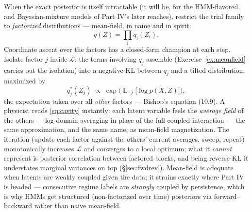 \documentclass[11pt]{article}
\numberwithin{equation}{section}
\theoremstyle{plain}
\theoremstyle{definition}
\theoremstyle{remark}
\DeclareMathOperator{\E}{\mathbb{E}}
\newcommand{\ELBO}{\mathcal{L}}
\begin{document}
When the exact posterior is itself intractable (it will be, for the HMM-flavored and Bayesian-mixture models of Part IV's later reaches), restrict the trial family to \emph{factorized} distributions --- mean-field, in name and in spirit:
\begin{equation}
q(Z) = \prod_{i} q_i(Z_i).
\label{eq:meanfield}
\end{equation}
Coordinate ascent over the factors has a closed-form champion at each step. Isolate factor $j$ inside $\ELBO$: the terms involving $q_j$ assemble (Exercise~\ref{ex:meanfield} carries out the isolation) into a negative KL between $q_j$ and a tilted distribution, maximized by
\begin{equation}
q_j^\ast(Z_j) \;\propto\; \exp\!\Big( \E_{-j}\big[ \log p(X, Z) \big] \Big),
\label{eq:cavity}
\end{equation}
the expectation taken over all \emph{other} factors --- Bishop's equation (10.9). A physicist reads \eqref{eq:cavity} instantly: each latent variable feels the \emph{average field} of the others --- log-domain averaging in place of the full coupled interaction --- the same approximation, and the same name, as mean-field magnetization. The iteration (update each factor against the others' current averages, sweep, repeat) monotonically increases $\ELBO$ and converges to a local optimum; what it \emph{cannot} represent is posterior correlation between factored blocks, and being reverse-KL it understates marginal variances on top (\S\ref{sec:fwdrev}). Mean-field is adequate when latents are weakly coupled given the data; it strains exactly where Part IV is headed --- consecutive regime labels are \emph{strongly} coupled by persistence, which is why HMMs get structured (non-factorized over time) posteriors via forward--backward rather than naive mean-field.
\end{document}
